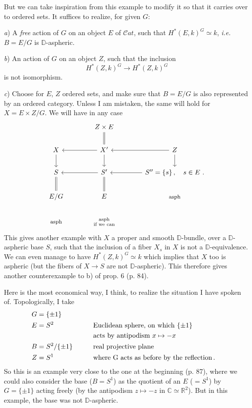 \documentclass[11pt]{article}
\newcommand{\printedpage}[1]{\marginpar{\footnotesize p.~#1}}
\newcommand{\msp}[1]{\marginpar{\footnotesize [#1]}}
\newcommand{\Cat}{\mathcal{C}\mathit{at}}
\newcommand{\D}{\mathbb{D}}
\newcommand{\RR}{\mathbb{R}}
\begin{document}
\printedpage{57}

\msp{page 93}
But we can take inspiration from this example to modify it so that it carries over to ordered sets. It suffices to realize, for given $G$:

\textit{a}) A \textit{free} action of $G$ on an object $E$ of $\Cat$, such that $H^*(E,k)^G \simeq k$, \textit{i.e.} $B = E/G$ is $\D$-aspheric.

\textit{b}) An action of $G$ on an object $Z$, such that the inclusion
\[ H^*(Z,k)^G \longrightarrow H^*(Z,k)^G \] %
is not isomorphism.

\textit{c}) Choose for $E$, $Z$ ordered sets, and make sure that $B = E/G$ is also represented by an ordered category. Unless I am mistaken, the same will hold for $X = E \times Z/G$. We will have in any case %
\[
\begin{tikzcd}[column sep=large]
 & Z \times E \arrow[d, equal] & \\
X \arrow[d] & X' \arrow[l] \arrow[d] & Z \arrow[l] \arrow[d] \\
S \arrow[d, equal] & S' \arrow[l] \arrow[d, equal] & S'' = \{s\}\, , \quad s \in E \ . \arrow[l] \\
E/G & E & \text{\footnotesize asph} \\
\text{\footnotesize asph} & \substack{\text{asph} \\ \text{if we can}} &
\end{tikzcd}
\]
This gives another example with $X$ a proper and smooth $\D$-bundle, over a $\D$-aspheric base $S$, such that the inclusion of a fiber $X_s$ in $X$ is not a $\D$-equivalence. We can even manage to have $H^*(Z,k)^G \simeq k$ which implies
\msp{page 94}
that $X$ too is aspheric (but the fibers of $X \to S$ are not $\D$-aspheric). This therefore gives another counterexample to b) of prop. 6 (p. 84).

Here is the most economical way, I think, to realize the situation I have spoken of. Topologically, I take %
\[
\begin{aligned}
G &= \{\pm 1\} \\
E &= S^2 &\qquad& \text{Euclidean sphere, on which } \{\pm 1\} \\
  &      &&      \text{acts by antipodism } x \mapsto -x \\
B &= S^2/\{\pm 1\} && \text{real projective plane} \\
Z &= S^1 && \text{where G acts as before by the reflection\,.}
\end{aligned}
\]
So this is an example very close to the one at the beginning (p. 87), where we could also consider the base ($B = S^1$) as the quotient of an $E$ ($= S^1$) by $G = \{\pm 1\}$ acting freely (by
\printedpage{58}
the antipodism $z \mapsto -z$ in $\mathbb{C} \simeq \RR^2$). But in this example, the base was not $\D$-aspheric.
\end{document}
